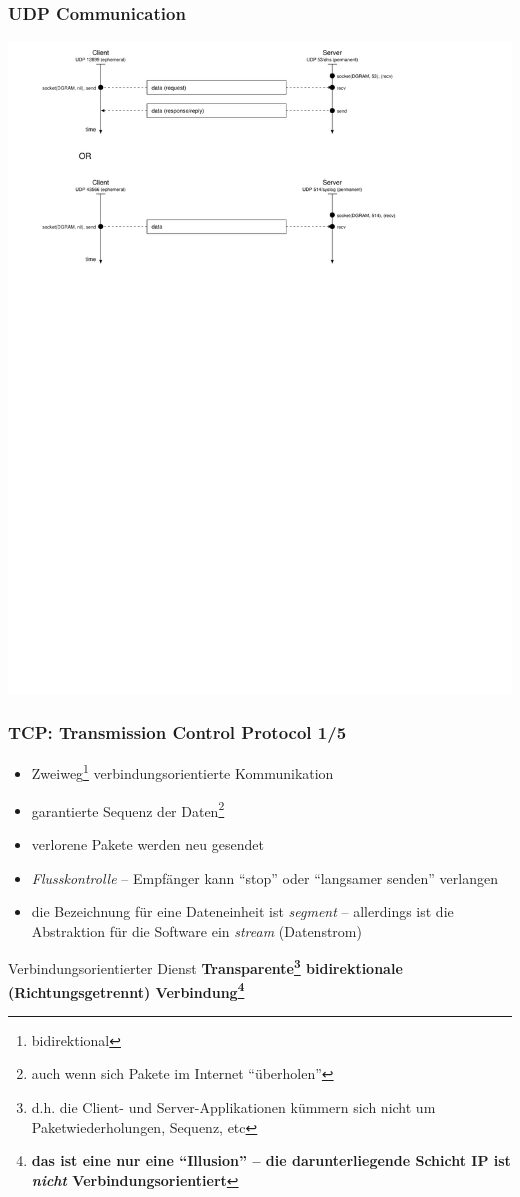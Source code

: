\documentclass[ignorenonframetext]{beamer}
\begin{document}
\begin{frame}
\frametitle{UDP Communication}
\includegraphics[width=15cm]{udp-communication}
\end{frame}




\begin{frame}
\frametitle{TCP: Transmission Control Protocol 1/5}
\begin{itemize}
	\item{Zweiweg\footnote{bidirektional} verbindungsorientierte Kommunikation}
	\item{garantierte Sequenz der Daten\footnote{auch wenn sich Pakete im Internet ``\"uberholen''}}
	\item{verlorene Pakete werden neu gesendet}
	\item{{\em Flusskontrolle} -- Empf\"anger kann ``stop'' oder ``langsamer senden'' verlangen}
	\item{die Bezeichnung f\"ur eine Dateneinheit ist {\em segment} -- allerdings ist die Abstraktion f\"ur die Software ein {\em stream} (Datenstrom)}
\end{itemize}
\begin{block}{Verbindungsorientierter Dienst}
\textbf{Transparente\footnote{d.h. die Client- und Server-Applikationen k\"ummern sich nicht um Paketwiederholungen, Sequenz, etc} bidirektionale (Richtungsgetrennt) Verbindung\footnote{\textbf{das ist eine nur eine ``Illusion'' -- die darunterliegende Schicht IP ist {\em nicht} Verbindungsorientiert}}}
\end{block}
\end{frame}
\end{document}
